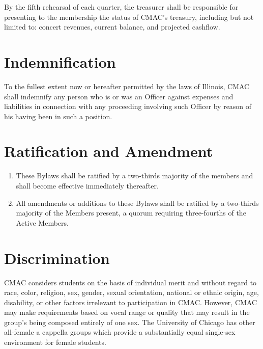 \documentclass{article}
\begin{document}
By the fifth rehearsal of each quarter, the treasurer shall be responsible
for presenting to the membership the status of CMAC's treasury, including
but not limited to: concert revenues, current balance, and projected
cashflow.

\section{Indemnification}

To the fullest extent now or hereafter permitted by the laws of Illinois,
CMAC shall indemnify any person who is or was an Officer against expenses
and liabilities in connection with any proceeding involving such Officer
by reason of his having been in such a position.

\section{Ratification and Amendment}
\begin{enumerate}
\item These Bylaws shall be ratified by a two-thirds majority of the members
and shall become effective immediately thereafter.
\item All amendments or additions to these Bylaws shall be ratified by a
two-thirds majority of the Members present, a quorum requiring three-fourths
of the Active Members.
\end{enumerate}

\section{Discrimination}

CMAC considers students on the basis of individual
merit and without regard to race, color, religion, sex, gender, sexual
orientation, national or ethnic origin, age, disability, or other
factors irrelevant to participation in CMAC. However,
CMAC may make requirements based on vocal range or quality that may
result in the group's being composed entirely of one
sex. The University of Chicago has other all-female a cappella groups
which provide a substantially equal single-sex environment for female
students.
\end{document}
